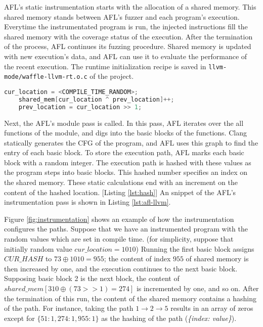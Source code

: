 AFL's static instrumentation starts with the allocation of a shared memory. This shared memory stands between AFL's fuzzer and each program's execution. Everytime the instrumentated program is run, the injected instructions fill the shared memory with the coverage status of the execution. After the termination of the process, AFL continues its fuzzing procedure. Shared memory is updated with new execution's data, and AFL can use it to evaluate the performance of the recent execution. The runtime initialization recipe is saved in \texttt{llvm-mode/waffle-llvm-rt.o.c} of the project.

\begin{lstlisting}[language=C++,style=CodeStyle,label={lst:hash},caption={Select element and update in shared\_mem}]
    cur_location = <COMPILE_TIME_RANDOM>;
    shared_mem[cur_location ^ prev_location]++; 
    prev_location = cur_location >> 1;
\end{lstlisting}

Next, the AFL's module pass is called. In this pass, AFL iterates over the all functions of the module, and digs into the basic blocks of the functions. Clang statically generates the CFG of the program, and AFL uses this graph to find the entry of each basic block. To store the execution path, AFL marks each basic block with a random integer. The execution path is hashed with these values as the program steps into basic blocks. This hashed number specifies an index on the shared memory. These static calculations end with an increment on the content of the hashed location. [Listing \ref{lst:hash}]
An snippet of the AFL's instrumentation pass is shown in Listing \ref{lst:afl-llvm}.



Figure \ref{fig:instrumentation} shows an example of how the instrumentation configures the paths. Suppose that we have an instrumented program with the random values which are set in compile time. (for simplicity, suppose that initially random value $cur\_location=1010$) Running the first basic block assigns $CUR\_HASH$ to $73\oplus1010=955$; the content of index $955$ of shared memory is then increased by one, and the execution continues to the next basic block. Supposing basic block 2 is the next block, the content of $shared\_mem[310\oplus(73>>1)=274]$ is incremented by one, and so on. After the termination of this run, the content of the shared memory contains a hashing of the path. For instance, taking the path $1\rightarrow2\rightarrow5$ results in an array of zeros except for $\{51: 1, 274: 1, 955: 1\}$ as the hashing of the path (\textit{\{index: value\}}).

